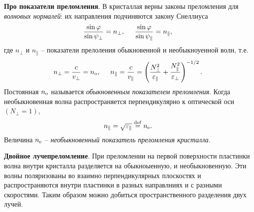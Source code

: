 \textbf{Про показатели преломления}. В кристаллая верны законы преломления для \textit{волновых нормалей}: их направления подчиняются закону Снеллиуса
\begin{equation*}
    \frac{\sin \varphi}{\sin \psi_\bot} = n_\bot,
    \hspace{5 mm} 
    \frac{\sin \varphi}{\sin \psi_{\parallel}} = n_{\parallel},
\end{equation*}
где $n_\bot$ и $n_\parallel$ -- показатели прелоления обыкновенной и необыкноуенной волн, т.е.
\begin{equation*}
    n_\bot = \frac{c}{v_\bot} = n_{\textnormal{o}},
    \hspace{5 mm} 
    n_\parallel = \frac{c}{v_\parallel} = \left(\frac{N^2_\bot}{\varepsilon_\parallel}+\frac{N^2_\parallel}{\varepsilon_\bot}\right)^{-1/2}.
\end{equation*}
Постоянная $n_{\textnormal{o}}$ называется \textit{обыкновенным показателем преломления}. Когда необыкновенная волна распространяется перпендикулярно к оптической оси $(N_\bot=1)$, 
\begin{equation*}
    n_\parallel = \sqrt{\varepsilon_\parallel} \overset{\mathrm{def}}{=} n_{\textnormal{e}}.
\end{equation*}
Величина $n_{\textnormal{e}}$ -- \textit{необыкновенный показатель преломления кристалла}. 


\textbf{Двойное лучепреломление}. При преломлении на первой поверхности пластинки волна внутри кристалла разделяется на обыкноыенную, и необыкновенную. Эти волны поляризованы во взаимно перпендикулярных плоскостях и распространяются внутри пластинки в разных направлниях и с разными скоростями. Таким образом можно добиться пространственного разделения двух лучей. 

